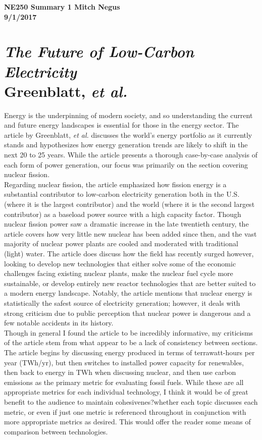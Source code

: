 \documentclass{report}
\newcommand{\tab}{\-\hspace{1cm}}
\begin{document}
\thispagestyle{empty}

{\bf {\large {NE250 Summary {1} \hfill Mitch Negus\\
		\hspace*{\fill} 9/1/2017\\ }}}
\section*{\textit{The Future of Low-Carbon Electricity} \\ \normalsize Greenblatt, \textit{et al.}}

\tab Energy is the underpinning of modern society, and so understanding the current and future energy landscapes is essential for those in the energy sector. The article by Greenblatt, \textit{et al.} discusses the world's energy portfolio as it currently stands and hypothesizes how energy generation trends are likely to shift in the next 20 to 25 years. While the article presents a thorough case-by-case analysis of each form of power generation, our focus was primarily on the section covering nuclear fission.\\
\tab Regarding nuclear fission, the article emphasized how fission energy is a substantial contributor to low-carbon electricity generation both in the U.S. (where it is the largest contributor) and the world (where it is the second largest contributor) as a baseload power source with a high capacity factor. Though nuclear fission power saw a dramatic increase in the late twentieth century, the article covers how very little new nuclear has been added since then, and the vast majority of nuclear power plants are cooled and moderated with traditional (light) water. The article does discuss how the field has recently surged however, looking to develop new technologies that either solve some of the economic challenges facing existing nuclear plants, make the nuclear fuel cycle more sustainable, or develop entirely new reactor technologies that are better suited to a modern energy landscape. Notably, the article mentions that nuclear energy is statistically the safest source of electricity generation; however, it deals with strong criticism due to public perception that nuclear power is dangerous and a few notable accidents in its history. \\
\tab Though in general I found the article to be incredibly informative, my criticisms of the article stem from what appear to be a lack of consistency between sections. The article begins by discussing energy produced in terms of terrawatt-hours per year (TWh/yr), but then switches to installed power capacity for renewables, then back to energy in TWh when discussing nuclear, and then use carbon emissions as the primary metric for evaluating fossil fuels. While these are all appropriate metrics for each individual technology, I think it would be of great benefit to the audience to maintain cohesivenes?whether each topic discusses each metric, or even if just one metric is referenced throughout in conjunction with more appropriate metrics as desired. This would offer the reader some means of comparison between technologies.
\end{document}
